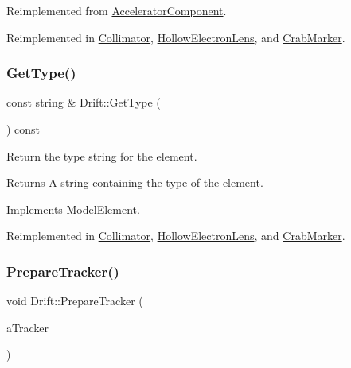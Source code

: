 Reimplemented from \hyperlink{classAcceleratorComponent_abd1490171ac9af6004d3da01fb3b95fb}{Accelerator\+Component}.



Reimplemented in \hyperlink{classCollimator_a158a9d8999d55a27efe4e56e5af8b56a}{Collimator}, \hyperlink{classHollowElectronLens_a87c06909a695e81cb1abc546019e4e40}{Hollow\+Electron\+Lens}, and \hyperlink{classCrabMarker_ae8678c41613db9792f84faf3feb88f2b}{Crab\+Marker}.

\mbox{\label{classDrift_a9f5e7d0aafd8689a4420b3d5e7b6879e}} 
\subsubsection{\texorpdfstring{Get\+Type()}{GetType()}}
{\footnotesize\ttfamily const string \& Drift\+::\+Get\+Type (\begin{DoxyParamCaption}{ }\end{DoxyParamCaption}) const\hspace{0.3cm}{\ttfamily [virtual]}}

Return the type string for the element. \begin{DoxyReturn}{Returns}
A string containing the type of the element. 
\end{DoxyReturn}


Implements \hyperlink{classModelElement_a04dc2e51e1999fca612eb1838ec6b271}{Model\+Element}.



Reimplemented in \hyperlink{classCollimator_aab811743031565147b965ca9b9fdfbc4}{Collimator}, \hyperlink{classHollowElectronLens_add07b8f08bad11edfb3df87be488e9ff}{Hollow\+Electron\+Lens}, and \hyperlink{classCrabMarker_a45ab65449808d5072eb033858c2d961a}{Crab\+Marker}.

\mbox{\label{classDrift_a9f3925549a0c7c99b39a1abea8546642}} 
\subsubsection{\texorpdfstring{Prepare\+Tracker()}{PrepareTracker()}}
{\footnotesize\ttfamily void Drift\+::\+Prepare\+Tracker (\begin{DoxyParamCaption}\item[{\hyperlink{classComponentTracker}{Component\+Tracker} \&}]{a\+Tracker }\end{DoxyParamCaption})\hspace{0.3cm}{\ttfamily [virtual]}}

